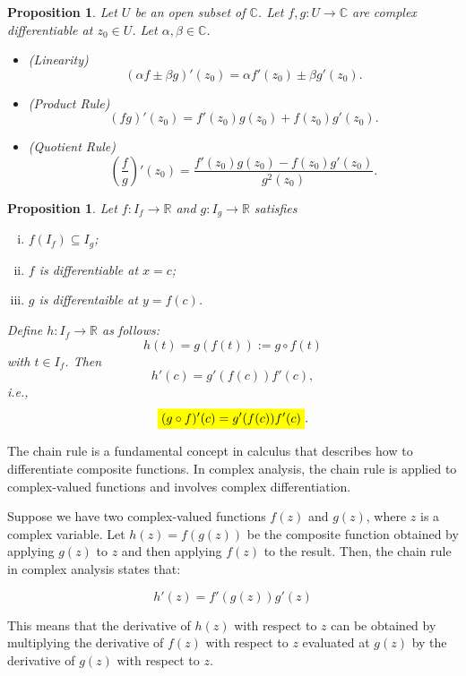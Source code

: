 \documentclass[12pt,openany]{book}
\newcommand{\mathcolorbox}[2]{\colorbox{#1}{$\displaystyle #2$}}
\newtheorem{proposition}[theorem]{Proposition}
\theoremstyle{definition}
\newcommand{\R}{\mathbb{R}}
\newcommand{\C}{\mathbb{C}}
\newcommand{\ie}{\textnormal{i.e.}}
\begin{document}
	
	\begin{tcolorbox}[colframe=procolor, title={\color{white}\bf }]
		\begin{proposition}
			Let $U$ be an open subset of $\C$. Let $f,g:U\to\C$ are complex differentiable at $z_0\in U$. Let $\alpha,\beta\in\C$. \begin{itemize}
				\item (Linearity) \[
				\left(\alpha f\pm\beta g\right)'(z_0)=\alpha f'(z_0)\pm\beta g'(z_0).
				\]
				\item (Product Rule) \[
				\left(fg\right)'(z_0)=f'(z_0)g(z_0)+f(z_0)g'(z_0).
				\]
				\item (Quotient Rule) \[
				\left(\frac{f}{g}\right)'(z_0)=\frac{f'(z_0)g(z_0)-f(z_0)g'(z_0)}{g^2(z_0)}.
				\]
			\end{itemize}
		\end{proposition}
	\end{tcolorbox}
	
	\begin{tcolorbox}[colframe=procolor, title={\color{white}\bf Chain Rule}]
		\begin{proposition}
			Let $f:I_f\to\R$ and $g:I_g\to\R$ satisfies \begin{enumerate}[(i)]
				\item $f(I_f)\subseteq I_g$;
				\item $f$ is differentiable at $x=c$;
				\item $g$ is differentaible at $y=f(c)$.
			\end{enumerate} Define $h:I_f\to\R$ as follows: \[
			h(t)=g(f(t)):=g\circ f(t)
			\] with $t\in I_f$. Then \[
			h'(c)=g'(f(c))f'(c),
			\] \ie, \[
			\mathcolorbox{-blue}{(g\circ f)'(c)=g'(f(c))f'(c)}.
			\]
		\end{proposition}
	\end{tcolorbox}
	The chain rule is a fundamental concept in calculus that describes how to differentiate composite functions. In complex analysis, the chain rule is applied to complex-valued functions and involves complex differentiation.
	
	Suppose we have two complex-valued functions $f(z)$ and $g(z)$, where $z$ is a complex variable. Let $h(z) = f(g(z))$ be the composite function obtained by applying $g(z)$ to $z$ and then applying $f(z)$ to the result. Then, the chain rule in complex analysis states that:
	
	$$h'(z) = f'(g(z)) g'(z)$$
	
	This means that the derivative of $h(z)$ with respect to $z$ can be obtained by multiplying the derivative of $f(z)$ with respect to $z$ evaluated at $g(z)$ by the derivative of $g(z)$ with respect to $z$.
	
\end{document}
